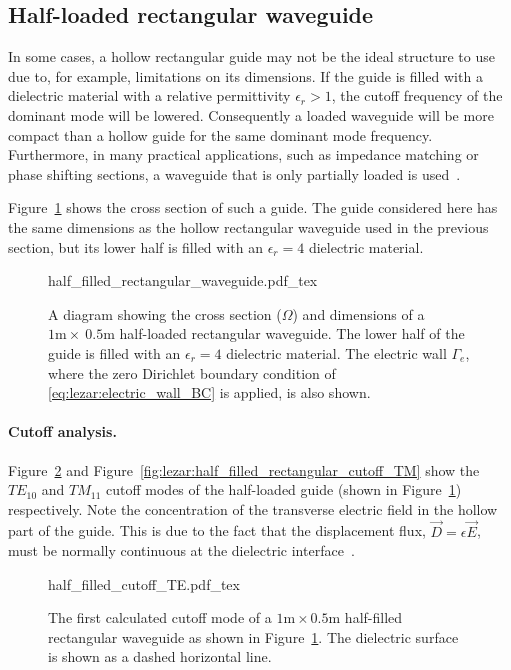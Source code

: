 \subsection{Half-loaded rectangular waveguide}

In some cases, a hollow rectangular guide may not be the ideal structure
to use due to, for example, limitations on its dimensions. If the guide
is filled with a dielectric material with a relative permittivity
$\epsilon_r > 1$, the cutoff frequency of the dominant mode will be
lowered. Consequently a loaded waveguide will be more compact than
a hollow guide for the same dominant mode frequency. Furthermore,
in many practical applications, such as impedance matching or phase
shifting sections, a waveguide that is only partially loaded is
used~\citep{Pozar2005}.

Figure~\ref{fig:lezar:half_filled_rectangular_guide} shows the cross
section of such a guide. The guide considered here has the same dimensions
as the hollow rectangular waveguide used in the previous section, but
its lower half is filled with an $\epsilon_r = 4$ dielectric material.
\begin{figure}
    \centering
    \def\svgwidth{\smallfig}
    {half_filled_rectangular_waveguide.pdf_tex}
    \caption{A diagram showing the cross section ($\Omega$)
    and dimensions of a $1\text{m}\times~0.5\text{m}$ half-loaded
    rectangular waveguide. The lower half of the guide is filled with
    an $\epsilon_r = 4$ dielectric material. The electric
    wall $\Gamma_e$, where the zero Dirichlet boundary condition of
    \eqref{eq:lezar:electric_wall_BC} is applied, is also shown.}
    \label{fig:lezar:half_filled_rectangular_guide}
\end{figure}

\paragraph{Cutoff analysis.}

Figure~\ref{fig:lezar:half_filled_rectangular_cutoff_TE} and
Figure~\ref{fig:lezar:half_filled_rectangular_cutoff_TM} show the
$TE_{10}$ and $TM_{11}$ cutoff modes of the half-loaded guide (shown in
Figure~\ref{fig:lezar:half_filled_rectangular_guide}) respectively. Note
the concentration of the transverse electric field in the hollow part of
the guide. This is due to the fact that the displacement flux, $\vec{D}
= \epsilon\vec{E}$, must be normally continuous at the dielectric
interface~\citep{Pozar2005, Smith1997}.
\begin{figure}
\bwfig
\centering
  \def\svgwidth{\smallfig}
    {half_filled_cutoff_TE.pdf_tex}
\caption{The first calculated cutoff mode of a
$1\text{m}\times0.5\text{m}$ half-filled rectangular waveguide as shown
in Figure~\ref{fig:lezar:half_filled_rectangular_guide}. The dielectric
surface is shown as a dashed horizontal line.}
\label{fig:lezar:half_filled_rectangular_cutoff_TE}
\end{figure}

